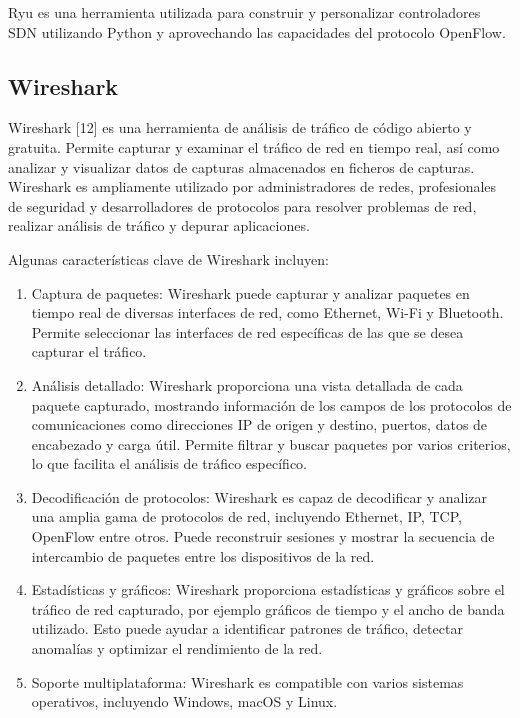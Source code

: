 \documentclass[a4paper, 12pt]{book}
\begin{document}
	Ryu es una herramienta utilizada para construir y personalizar controladores SDN utilizando Python y aprovechando las capacidades del protocolo OpenFlow. 
	
	\subsection{Wireshark} 
	\label{sec:wireshark}
	
	Wireshark [12] es una herramienta de análisis de tráfico de código abierto y gratuita. Permite capturar y examinar el tráfico de red en tiempo real, así como analizar y visualizar datos de capturas almacenados en ficheros de capturas. Wireshark  es ampliamente utilizado por administradores de redes, profesionales de seguridad y desarrolladores de protocolos para resolver problemas de red, realizar análisis de tráfico y depurar aplicaciones.
	
	Algunas características clave de Wireshark incluyen:
	
	\begin{enumerate}
		\item 	Captura de paquetes: Wireshark puede capturar y analizar paquetes en tiempo real de diversas interfaces de red, como Ethernet, Wi-Fi y Bluetooth. Permite seleccionar las interfaces de red específicas de las que se desea capturar el tráfico.	
		\item 	Análisis detallado: Wireshark proporciona una vista detallada de cada paquete capturado, mostrando información de los campos de los protocolos de comunicaciones como direcciones IP de origen y destino, puertos, datos de encabezado y carga útil. Permite filtrar y buscar paquetes por varios criterios, lo que facilita el análisis de tráfico específico.
		\item 	Decodificación de protocolos: Wireshark es capaz de decodificar y analizar una amplia gama de protocolos de red, incluyendo Ethernet, IP, TCP, OpenFlow entre otros. Puede reconstruir sesiones y mostrar la secuencia de intercambio de paquetes entre los dispositivos de la red.
		\item 	Estadísticas y gráficos: Wireshark proporciona estadísticas y gráficos sobre el tráfico de red capturado, por ejemplo gráficos de tiempo y el ancho de banda utilizado. Esto puede ayudar a identificar patrones de tráfico, detectar anomalías y optimizar el rendimiento de la red.
		\item   Soporte multiplataforma: Wireshark es compatible con varios sistemas operativos, incluyendo Windows, macOS y Linux. 
	\end{enumerate}
	
\end{document}
